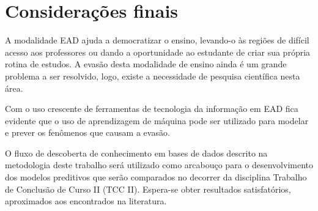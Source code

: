 \chapter{Considerações finais}

A modalidade EAD ajuda a democratizar o ensino, levando-o às regiões de difícil
acesso aos professores ou dando a oportunidade ao estudante de criar sua própria
rotina de estudos. A evasão desta modalidade de ensino ainda é um grande
problema a ser resolvido, logo, existe a necessidade de pesquisa científica
nesta área.

Com o uso crescente de ferramentas de tecnologia da informação em EAD fica
evidente que o uso de aprendizagem de máquina pode ser utilizado para modelar e
prever os fenômenos que causam a evasão.

O fluxo de descoberta de conhecimento em bases de dados descrito na metodologia
deste trabalho será utilizado como arcabouço para o desenvolvimento dos modelos
preditivos que serão comparados no decorrer da disciplina Trabalho de Conclusão
de Curso II (TCC II). Espera-se obter resultados satisfatórios, aproximados aos
encontrados na literatura.
